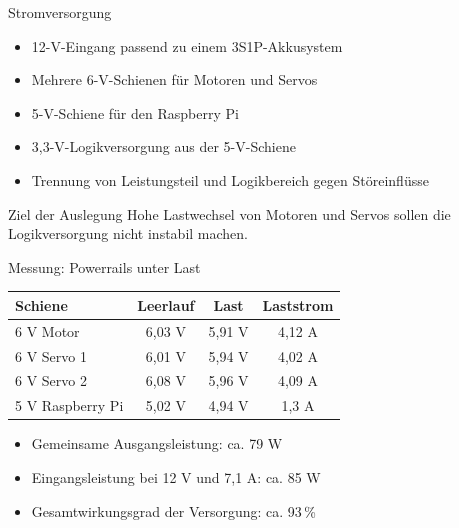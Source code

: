 \documentclass[aspectratio=169,11pt]{beamer}
\newcommand{\smallitem}{\setlength{\itemsep}{0.45em}}
\begin{document}
\begin{frame}{Stromversorgung}
  \begin{itemize}
    \smallitem
    \item 12-V-Eingang passend zu einem 3S1P-Akkusystem
    \item Mehrere 6-V-Schienen f\"ur Motoren und Servos
    \item 5-V-Schiene f\"ur den Raspberry Pi
    \item 3,3-V-Logikversorgung aus der 5-V-Schiene
    \item Trennung von Leistungsteil und Logikbereich gegen St\"oreinfl\"usse
  \end{itemize}

  \vspace{0.4em}
  \begin{block}{Ziel der Auslegung}
    Hohe Lastwechsel von Motoren und Servos sollen die Logikversorgung nicht instabil machen.
  \end{block}
\end{frame}

\begin{frame}{Messung: Powerrails unter Last}
  \begin{table}
    \centering
    \small
    \begin{tabular}{lccc}
      \toprule
      Schiene & Leerlauf & Last & Laststrom \\
      \midrule
      6 V Motor & 6,03 V & 5,91 V & 4,12 A \\
      6 V Servo 1 & 6,01 V & 5,94 V & 4,02 A \\
      6 V Servo 2 & 6,08 V & 5,96 V & 4,09 A \\
      5 V Raspberry Pi & 5,02 V & 4,94 V & 1,3 A \\
      \bottomrule
    \end{tabular}
  \end{table}

  \begin{itemize}
    \item Gemeinsame Ausgangsleistung: ca. 79 W
    \item Eingangsleistung bei 12 V und 7,1 A: ca. 85 W
    \item Gesamtwirkungsgrad der Versorgung: ca. 93\,\%
  \end{itemize}
\end{frame}
\end{document}
